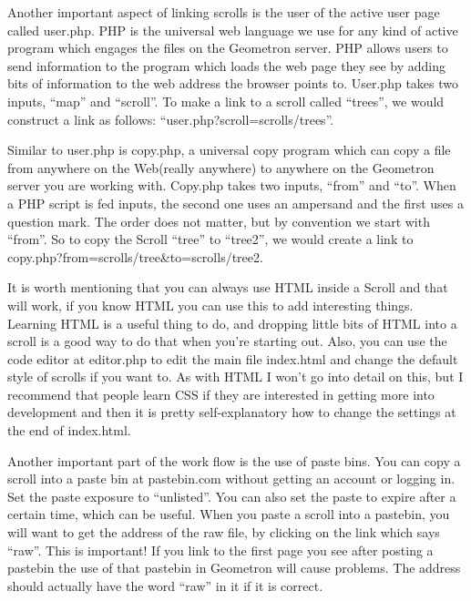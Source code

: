 Another important aspect of linking scrolls is the user of the active user page called user.php.  PHP is the universal web language we use for any kind of active program which engages the files on the Geometron server.  PHP allows users to send information to the program which loads the web page they see by adding bits of information to the web address the browser points to.  User.php takes two inputs, ``map'' and ``scroll''.  To make a link to a scroll called ``trees'', we would construct a link as follows: ``user.php?scroll=scrolls/trees''.  

Similar to user.php is copy.php, a universal copy program which can copy a file from anywhere on the Web(really anywhere) to anywhere on the Geometron server you are working with.  Copy.php takes two inputs, ``from'' and ``to''.  When a PHP script is fed inputs, the second one uses an ampersand and the first uses a question mark.  The order does not matter, but by convention we start with ``from''.  So to copy the Scroll ``tree'' to ``tree2'', we would create a link to copy.php?from=scrolls/tree&to=scrolls/tree2.  

It is worth mentioning that you can always use HTML inside a Scroll and that will work, if you know HTML you can use this to add interesting things.  Learning HTML is a useful thing to do, and dropping little bits of HTML into a scroll is a good way to do that when you're starting out.  Also, you can use the code editor at editor.php to edit the main file index.html and change the default style of scrolls if you want to.  As with HTML I won't go into detail on this, but I recommend that people learn CSS if they are interested in getting more into development and then it is pretty self-explanatory how to change the settings at the end of index.html.

Another important part of the work flow is the use of paste bins.  You can copy a scroll into a paste bin at pastebin.com without getting an account or logging in. Set the paste exposure to ``unlisted''.  You can also set the paste to expire after a certain time, which can be useful.  When you paste a scroll into a pastebin, you will want to get the address of the raw file, by clicking on the link which says ``raw''.  This is important! If you link to the first page you see after posting a pastebin the use of that pastebin in Geometron will cause problems. The address should actually have the word ``raw'' in it if it is correct.

